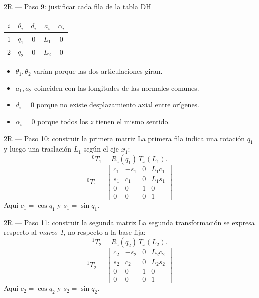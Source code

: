 \documentclass[aspectratio=169,11pt]{beamer}
\begin{document}
\begin{frame}[t]{2R — Paso 9: justificar cada fila de la tabla DH}
 \small
 \begin{tabular}{c|cccc}
  \toprule
  $i$ & $\theta_i$ & $d_i$ & $a_i$ & $\alpha_i$\\\midrule
  1 & $q_1$ & $0$ & $L_1$ & $0$\\
  2 & $q_2$ & $0$ & $L_2$ & $0$\\
  \bottomrule
 \end{tabular}
 \pause
 \vspace{0.22cm}
 \begin{itemize}
  \item $\theta_1,\theta_2$ varían porque las dos articulaciones giran.
  \item $a_1,a_2$ coinciden con las longitudes de las normales comunes.
  \item $d_i=0$ porque no existe desplazamiento axial entre orígenes.
  \item $\alpha_i=0$ porque todos los $z$ tienen el mismo sentido.
 \end{itemize}
\end{frame}

\begin{frame}[t]{2R — Paso 10: construir la primera matriz}
 \small
 La primera fila indica una rotación $q_1$ y luego
 una traslación $L_1$ según el eje $x_1$:
 \[
 {}^0T_1=R_z(q_1)\,T_x(L_1).
 \]
 \pause
 \[
 \boxed{{}^0T_1=
 \begin{bmatrix}
 c_1&-s_1&0&L_1c_1\\
 s_1&c_1&0&L_1s_1\\
 0&0&1&0\\0&0&0&1
 \end{bmatrix}}
 \]
 \small Aquí $c_1=\cos q_1$ y $s_1=\sin q_1$.
\end{frame}

\begin{frame}[t]{2R — Paso 11: construir la segunda matriz}
 \small
 La segunda transformación se expresa respecto al \emph{marco 1},
 no respecto a la base fija:
 \[
 {}^1T_2=R_z(q_2)\,T_x(L_2).
 \]
 \pause
 \[
 \boxed{{}^1T_2=
 \begin{bmatrix}
 c_2&-s_2&0&L_2c_2\\
 s_2&c_2&0&L_2s_2\\
 0&0&1&0\\0&0&0&1
 \end{bmatrix}}
 \]
 \small Aquí $c_2=\cos q_2$ y $s_2=\sin q_2$.
\end{frame}
\end{document}
